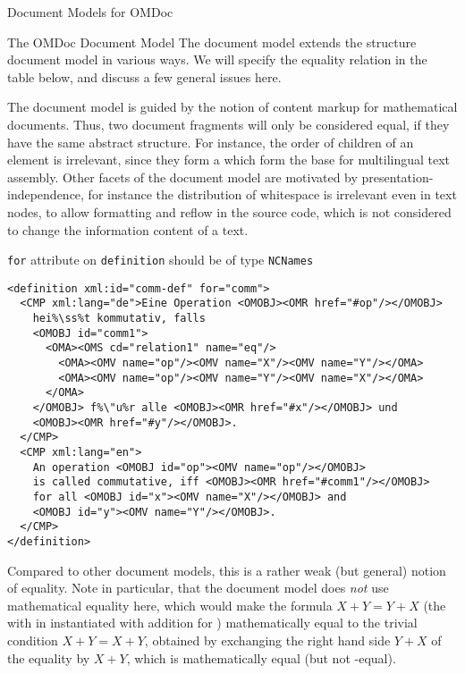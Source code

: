 \begin{tchapter}[id=document-model]{Document Models for OMDoc}
\begin{tsection}[id=omdom]{The OMDoc Document Model}
  The {\omdoc} document model extends the {\xml} structure document model in various ways.
  We will specify the equality relation in the table below, and discuss a few general
  issues here.

  The {\omdoc} document model is guided by the notion of content markup for mathematical
  documents. Thus, two document fragments will only be considered equal, if they have the
  same abstract structure. For instance, the order of {} children of an
  {} element is irrelevant, since they form a
  {} which form the base for multilingual text
  assembly. Other facets of the {\omdoc} document model are motivated by
  presentation-independence, for instance the distribution of whitespace is irrelevant
  even in text nodes, to allow formatting and reflow in the source code, which is not
  considered to change the information content of a text.

\begin{erratum}[reported-by=Michael Kohlhase,date=2009-08-11]{{\texttt{for}} attribute on
    {\texttt{definition}} should be of type {\texttt{NCNames}}}
\begin{lstlisting}[escapechar=\%,label=lst:third,
   index={definition,CMP,OMOBJ,OMA},
   caption={An {\omdoc}-Equal Representation for {\mylstsref{first}{second}}}]
<definition xml:id="comm-def" for="comm">
  <CMP xml:lang="de">Eine Operation <OMOBJ><OMR href="#op"/></OMOBJ> 
    hei%\ss%t kommutativ, falls 
    <OMOBJ id="comm1">
      <OMA><OMS cd="relation1" name="eq"/>
        <OMA><OMV name="op"/><OMV name="X"/><OMV name="Y"/></OMA>
        <OMA><OMV name="op"/><OMV name="Y"/><OMV name="X"/></OMA>
      </OMA>
    </OMOBJ> f%\"u%r alle <OMOBJ><OMR href="#x"/></OMOBJ> und 
    <OMOBJ><OMR href="#y"/></OMOBJ>.
  </CMP>
  <CMP xml:lang="en">
    An operation <OMOBJ id="op"><OMV name="op"/></OMOBJ>
    is called commutative, iff <OMOBJ><OMR href="#comm1"/></OMOBJ>
    for all <OMOBJ id="x"><OMV name="X"/></OMOBJ> and 
    <OMOBJ id="y"><OMV name="Y"/></OMOBJ>.
  </CMP>
</definition>
\end{lstlisting}
\end{erratum}

Compared to other document models, this is a rather weak (but general) notion of
equality. Note in particular, that the {\omdoc} document model does {\emph{not}}
use mathematical equality here, which would make the formula $X+Y=Y+X$ (the
{} with {} in
{} instantiated with addition for {}) mathematically
equal to the trivial condition $X+Y=X+Y$, obtained by exchanging the right hand
side $Y+X$ of the equality by $X+Y$, which is mathematically equal (but not
{\omdoc}-equal).


\end{tsection}
\end{tchapter}
